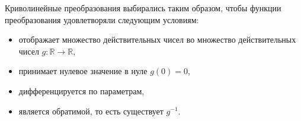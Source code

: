 \documentclass[12pt,twoside]{article}
\begin{document}
Криволинейные преобразования выбирались таким образом, чтобы функции преобразования удовлетворяли следующим условиям:
\begin{itemize}
    \item отображает множество действительных чисел во множество действительных чисел $g: \mathbb{R} \to \mathbb{R}$,
    \item принимает нулевое значение в нуле $g(0) = 0$,
    \item дифференцируется по параметрам,
    \item является обратимой, то есть существует $g^{-1}$.
\end{itemize}
\end{document}
